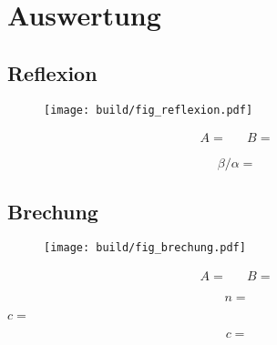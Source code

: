 \section{Auswertung}
\label{sec:auswertung}


\subsection{Reflexion}

\begin{figure}[H]
	\texttt{[image: build/fig\_reflexion.pdf]}
	\caption{}
	\label{fig:reflexion}
\end{figure}

\begin{align*}
	A =  && B = 
\end{align*}

\begin{table}[H]
	\centering
	\caption{}
	
	\label{tab:reflexion}
\end{table}

\begin{equation*}
	\beta / \alpha = 
\end{equation*}


\subsection{Brechung}

\begin{figure}[H]
	\texttt{[image: build/fig\_brechung.pdf]}
	\caption{}
	\label{fig:brechung}
\end{figure}

\begin{align*}
	A =  && B = 
\end{align*}

\begin{equation*}
	n = 
\end{equation*}

$c = $

\begin{equation*}
	c = 
\end{equation*}

